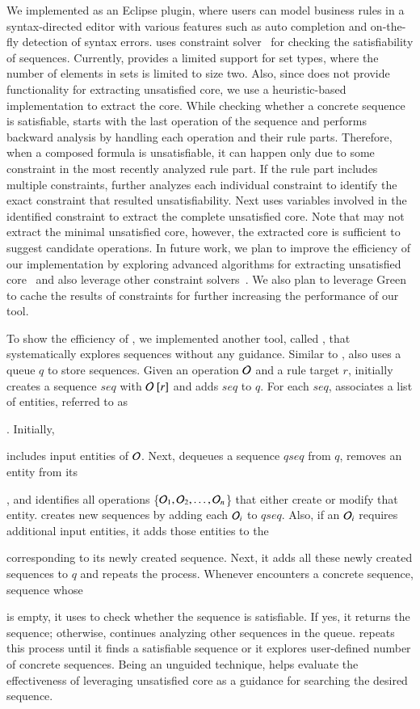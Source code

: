 We implemented \tool{} as an Eclipse plugin, where users can model business
rules in a syntax-directed editor with various features such as auto completion
and on-the-fly detection of syntax errors. \tool{} uses \choco{} constraint
solver~\cite{Choco} for checking the satisfiability of sequences.
Currently, \tool{} provides a limited support for set types, where the number
of elements in sets is limited to size two. Also, since \choco{} does not 
provide functionality for extracting unsatisfied core, we use a heuristic-based
implementation to extract the core. While checking whether a concrete sequence
is satisfiable, \tool{} starts with the last operation of the sequence and
performs backward analysis by handling each operation and their rule parts. Therefore, when
a composed formula is unsatisfiable, it can happen only due to some
constraint in the most recently analyzed rule part. If the rule part includes
multiple constraints, \tool{} further analyzes each individual constraint to identify
the exact constraint that resulted unsatisfiability. Next \tool{} uses
variables involved in the identified constraint to extract the complete
unsatisfied core. Note that \tool{} may not extract 
the minimal unsatisfied core, however, the extracted core is sufficient
to suggest candidate operations. In future work, we plan to improve the efficiency
of our implementation by exploring advanced algorithms for extracting unsatisfied core~\cite{Liffiton:2008:ACM}
and also leverage other constraint solvers~\cite{DeMoura:2008}. We
also plan to leverage Green~\cite{VisserGD12} to cache the results of constraints
for further increasing the performance of our tool.

To show the efficiency of \tool{}, we 
implemented another tool, called \exhaust{}, that systematically explores sequences
without any guidance. Similar to \tool{}, \exhaust{} also uses a queue $q$
to store sequences. Given an operation ${\cal O}$ and a rule target $r$, 
\exhaust{} initially creates a sequence $seq$ with ${\cal O}\ [r]$ and adds $seq$
to $q$. For each $seq$, \exhaust{} associates a list of entities, referred to as \subject{ilist}. 
Initially, \subject{ilist} includes input entities of ${\cal O}$.
Next, \exhaust{} dequeues a sequence $qseq$ from $q$, removes an entity from its \subject{ilist},
and identifies all operations \{${\cal O}_1, {\cal O}_2, \ldots, {\cal O}_n$\}
that either create or modify that entity. \exhaust{} creates new sequences 
by adding each ${\cal O}_i$ to $qseq$. Also, if an ${\cal O}_i$ requires additional
input entities, it adds those entities to the \subject{ilist} corresponding to its newly
created sequence. Next, it adds all these newly created sequences to $q$
and repeats the process. Whenever \exhaust{} encounters a concrete sequence,
\ie{} sequence whose \subject{ilist} is empty, it uses \choco{} to check whether
the sequence is satisfiable. If yes, it returns the sequence; otherwise, continues
analyzing other sequences in the queue. \exhaust{} repeats this process until 
it finds a satisfiable sequence or it explores user-defined number of concrete
sequences. Being an unguided technique, \exhaust{} helps evaluate
the effectiveness of leveraging unsatisfied core as a guidance for searching
the desired sequence.

